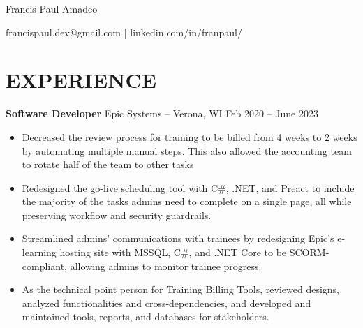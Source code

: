 \documentclass[11pt,letterpaper]{article}
\newcommand{\subheading}[3]{
    \textbf{#1}{ #2 }{\hfill #3 \vspace{-2pt}}
}
\begin{document}
\centerline{\Huge Francis Paul Amadeo}
\centerline{francispaul.dev@gmail.com | linkedin.com/in/franpaul/}


\section*{EXPERIENCE}
\subheading{Software Developer}{ Epic Systems -- Verona, WI}{Feb 2020 -- June 2023 \\}
\vspace{-10pt}
\begin{itemize}
  \item Decreased the review process for training to be billed from 4 weeks to 2 weeks by automating multiple manual steps. This also allowed the accounting team to rotate half of the team to other tasks
  \item Redesigned the go-live scheduling tool with C\#, .NET, and Preact to include the majority of the tasks admins need to complete on a single page, all while preserving workflow and security guardrails.
  \item Streamlined admins' communications with trainees by redesigning Epic's e-learning hosting site with MSSQL, C\#, and .NET Core to be SCORM-compliant, allowing admins to monitor trainee progress.
  \item As the technical point person for Training Billing Tools, reviewed designs, analyzed functionalities and cross-dependencies, and developed and maintained tools, reports, and databases for stakeholders.

\end{itemize}
\end{document}
